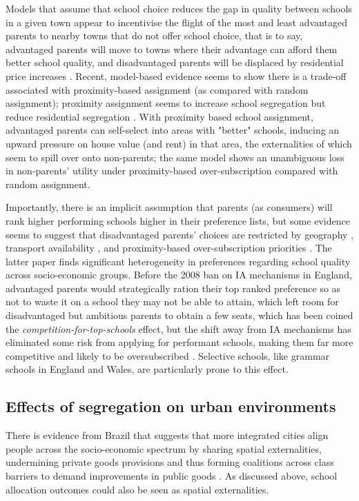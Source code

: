 \documentclass{article}
\begin{document}
\begin{multicols}{2}
Models that assume that school choice reduces the gap in quality between schools in a given town appear to incentivise the flight of the most and least advantaged parents to nearby towns that do not offer school choice, that is to say, advantaged parents will move to towns where their advantage can afford them better school quality, and disadvantaged parents will be displaced by residential price increases \cite{averyDistributionalConsequencesPublic2021}. Recent, model-based evidence seems to show there is a trade-off associated with proximity-based assignment (as compared with random assignment); proximity assignment seems to increase school segregation but reduce residential segregation \cite{greavesSchoolChoiceNeighborhood2024}. With proximity based school assignment, advantaged parents can self-select into areas with "better" schools, inducing an upward pressure on house value (and rent) in that area, the externalities of which seem to spill over onto non-parents; the same model shows an unambiguous loss in non-parents' utility under proximity-based over-subscription compared with random assignment.

Importantly, there is an implicit assumption that parents (as consumers) will rank higher performing schools higher in their preference lists, but some evidence seems to suggest that disadvantaged parents' choices are restricted by geography \cite{edwardsJustOutReach2021}, transport availability \cite{trajkovskiSchoolBusesMake2021}, and proximity-based over-subscription priorities \cite{burgessWhatParentsWant2015}. The latter paper finds significant heterogeneity in preferences regarding school quality across socio-economic groups. Before the 2008 ban on IA mechanisms in England, advantaged parents would strategically ration their top ranked preference so as not to waste it on a school they may not be able to attain, which left room for disadvantaged but ambitious parents to obtain a few seats, which has been coined the \textit{competition-for-top-schools} effect, but the shift away from IA mechanisms has eliminated some risk from applying for performant schools, making them far more competitive and likely to be oversubscribed \cite{pathakSchoolAdmissionsReform2013}. Selective schools, like grammar schools in England and Wales, are particularly prone to this effect.

\subsection{Effects of segregation on urban environments}
There is evidence from Brazil that suggests that more integrated cities align people across the socio-economic spectrum by sharing spatial externalities, undermining private goods provisions and thus forming coalitions across class barriers to demand improvements in public goods \cite{xuSegregationSpatialExternalities2024}. As discussed above, school allocation outcomes could also be seen as spatial externalities.


\end{multicols}
\end{document}
